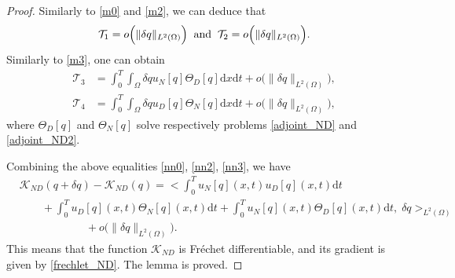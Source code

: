\documentclass[a4paper,12pt,reqno,natbib]{amsart}
\newcommand{\dx} {\displaystyle\mathrm{d}x}
\newcommand{\dt} {\displaystyle\mathrm{d}t}
\begin{document}
{\begin{proof}
Similarly to \eqref{m0} and \eqref{m2}, we can deduce that
\begin{align} \label{nn0}
\mathcal{T}_1 =o\Big(\|\delta q\|_{L^2(\Omega)}\Big)\;\;\hbox{and}\;\;\mathcal{T}_2 =o\Big(\|\delta q\|_{L^2(\Omega)}\Big). %
\end{align}
Similarly to \eqref{m3}, one can obtain
\begin{align}
\mathcal{T}_3&= \int_0^T\int_{\Omega} \delta q u_N[q] \Theta_D[q] \dx\dt+o\Big(\|\delta q\|_{L^2(\Omega)}\Big),\label{nn2}\\
     \mathcal{T}_4&= \int_0^T\int_{\Omega} \delta q u_D[q] \Theta_N[q] \dx\dt+o\Big(\|\delta q\|_{L^2(\Omega)}\Big),\label{nn3}
\end{align}
where $\Theta_D[q]$ and $\Theta_N[q]$ solve respectively problems \eqref{adjoint_ND} and \eqref{adjoint_ND2}. 

Combining the above equalities \eqref{nn0}, \eqref{nn2}, \eqref{nn3}, we have
\begin{align*}
    &\mathcal{K}_{ND}(q+\delta q) - \mathcal{K}_{ND}(q) = \Big<\int_{0}^T  u_N[q](x,t)u_D[q](x,t)\dt\\
    &\qquad+\int_{0}^Tu_D[q](x,t) \Theta_N[q](x,t)\dt+\int_{0}^Tu_N[q](x,t) \Theta_D[q](x,t)\dt,\;\delta q\Big>_{L^2(\Omega)}\\
&\qquad\qquad\qquad+o\Big(\|\delta q\|_{L^2(\Omega)}\Big).
\end{align*}
This means that the function $\mathcal{K}_{ND}$ is Fréchet differentiable, and its gradient is given by \eqref{frechlet_ND}. The lemma is proved.
\end{proof}


}
\end{document}
